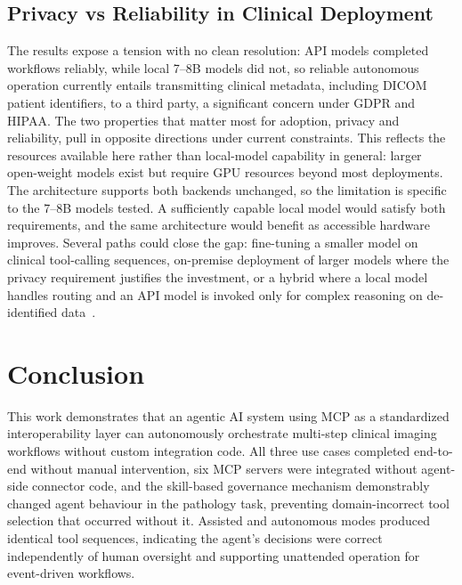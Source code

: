 \documentclass[preprint,12pt]{elsarticle}
\begin{document}
\subsection{Privacy vs Reliability in Clinical Deployment}
The results expose a tension with no clean resolution: API models completed workflows reliably, while local 7--8B models did not, so reliable autonomous operation currently entails transmitting clinical metadata, including DICOM patient identifiers, to a third party, a significant concern under GDPR and HIPAA. The two properties that matter most for adoption, privacy and reliability, pull in opposite directions under current constraints. This reflects the resources available here rather than local-model capability in general: larger open-weight models exist but require GPU resources beyond most deployments. The architecture supports both backends unchanged, so the limitation is specific to the 7--8B models tested. A sufficiently capable local model would satisfy both requirements, and the same architecture would benefit as accessible hardware improves. Several paths could close the gap: fine-tuning a smaller model on clinical tool-calling sequences, on-premise deployment of larger models where the privacy requirement justifies the investment, or a hybrid where a local model handles routing and an API model is invoked only for complex reasoning on de-identified data~\cite{trustworthyai2025, dietrich2025agentic, agiformedicalimaging2025}.

\section{Conclusion}
This work demonstrates that an agentic AI system using MCP as a standardized interoperability layer can autonomously orchestrate multi-step clinical imaging workflows without custom integration code. All three use cases completed end-to-end without manual intervention, six MCP servers were integrated without agent-side connector code, and the skill-based governance mechanism demonstrably changed agent behaviour in the pathology task, preventing domain-incorrect tool selection that occurred without it. Assisted and autonomous modes produced identical tool sequences, indicating the agent's decisions were correct independently of human oversight and supporting unattended operation for event-driven workflows.
\end{document}
